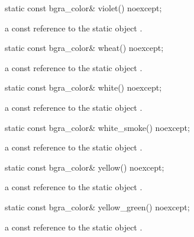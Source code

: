 \begin{itemdecl}
static const bgra_color& violet() noexcept;
\end{itemdecl}
\begin{itemdescr}
\pnum
\returns
a const reference to the static  object .
\end{itemdescr}

\begin{itemdecl}
static const bgra_color& wheat() noexcept;
\end{itemdecl}
\begin{itemdescr}
\pnum
\returns
a const reference to the static  object .
\end{itemdescr}

\begin{itemdecl}
static const bgra_color& white() noexcept;
\end{itemdecl}
\begin{itemdescr}
\pnum
\returns
a const reference to the static  object .
\end{itemdescr}

\begin{itemdecl}
static const bgra_color& white_smoke() noexcept;
\end{itemdecl}
\begin{itemdescr}
\pnum
\returns
a const reference to the static  object .
\end{itemdescr}

\begin{itemdecl}
static const bgra_color& yellow() noexcept;
\end{itemdecl}
\begin{itemdescr}
\pnum
\returns
a const reference to the static  object .
\end{itemdescr}

\begin{itemdecl}
static const bgra_color& yellow_green() noexcept;
\end{itemdecl}
\begin{itemdescr}
\pnum
\returns
a const reference to the static  object .
\end{itemdescr}

